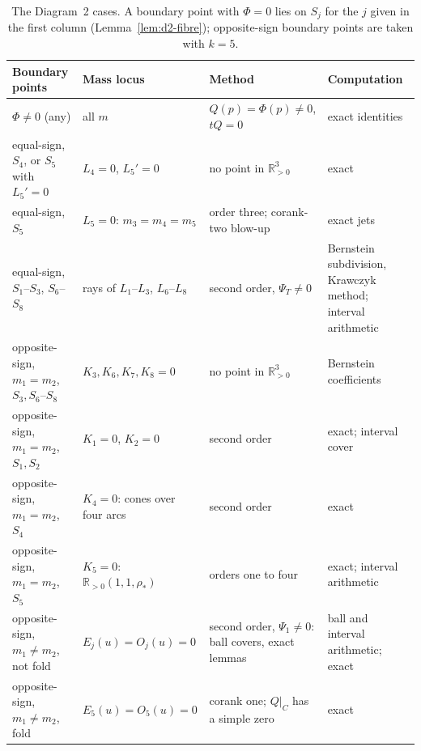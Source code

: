 \documentclass[Threeside,11pt]{article}
\theoremstyle{definition}
\theoremstyle{remark}
\numberwithin{equation}{section}
\theoremstyle{remark}
\newcommand{\Rp}{\mathbb{R}_{>0}}
\begin{document}
\begin{table}[ht]
\centering
\footnotesize
\setlength{\tabcolsep}{3pt}
\begin{tabular}{p{2.5cm}p{2.5cm}p{3.3cm}p{3.4cm}}
\hline
Boundary points & Mass locus & Method & Computation \\
\hline
$\Phi\ne0$ (any) & all $m$ & {$Q(p)=\Phi(p)\ne0$, $tQ=0$} & exact identities \\
equal-sign, $S_4$, or $S_5$ with $L_5'=0$ & $L_4=0$, $L_5'=0$ & no point in $\Rp^3$ & exact \\
equal-sign, $S_5$ & $L_5=0$: $m_3=m_4=m_5$ & order three; corank-two blow-up & exact jets \\
equal-sign, $S_1$--$S_3$, $S_6$--$S_8$ & rays of $L_1$--$L_3$, $L_6$--$L_8$ & second order,
{$\Psi_T\ne0$} & Bernstein subdivision, Krawczyk method; interval arithmetic \\
\hline
opposite-sign, $m_1=m_2$, $S_3,S_6$--$S_8$ & $K_3,K_6,K_7,K_8=0$ & no point in $\Rp^3$ &
Bernstein coefficients \\
opposite-sign, $m_1=m_2$, $S_1,S_2$ & $K_1=0$, $K_2=0$ & second order & exact; interval cover \\
opposite-sign, $m_1=m_2$, $S_4$ & {$K_4=0$: cones over four arcs} & second order & exact \\
opposite-sign, $m_1=m_2$, $S_5$ & $K_5=0$: $\Rp(1,1,\rho_*)$ & orders one to four &
exact; interval arithmetic \\
\hline
opposite-sign, $m_1\ne m_2$, not fold & $E_j(u)=O_j(u)=0$ & second order, $\Psi_1\ne0$: ball
covers, exact lemmas & ball and interval arithmetic; exact \\
opposite-sign, $m_1\ne m_2$, fold & $E_5(u)=O_5(u)=0$ & corank one; $Q|_C$ has a simple zero &
exact \\
\hline
\end{tabular}
\caption{The Diagram~2 cases.  A boundary point with $\Phi=0$ lies on $S_j$ for the $j$ given in the
first column (Lemma~\ref{lem:d2-fibre}); opposite-sign boundary points are taken with $k=5$.}
\label{tab:d2-cases}
\end{table}
\end{document}
